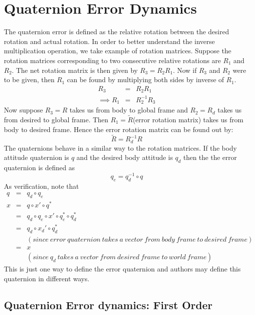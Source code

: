 \documentclass{article}
\begin{document}
	
	
	\section{Quaternion Error Dynamics}
	
	The quaternion error is defined as the relative rotation between the desired rotation and actual rotation. In order to better understand the inverse multiplication operation, we take example of rotation matrices. Suppose the rotation matrices corresponding to two consecutive relative rotations are $R_1$ and $R_2$. The net rotation matrix is then given by $R_3=R_2R_1$. Now if $R_3$ and $R_2$ were to be given, then $R_1$ can be found by multiplying both sides by inverse of $R_1$.
	\begin{eqnarray}
		R_3&=&R_2R_1\\
		\implies R_1 &=& R_2^{-1}R_3
	\end{eqnarray}
	Now suppose $R_3=R$ takes us from body to global frame and $R_2=R_d$ takes us from desired to global frame. Then $R_1=\tilde{R}$(error rotation matrix) takes us from body to desired frame. Hence the error rotation matrix can be found out by:
	\begin{equation}
		\tilde{R} = R_d^{-1}R
	\end{equation}
	The quaternions behave in a similar way to the rotation matrices. If the body attitude quaternion is $q$ and the desired body attitude is $q_d$ then the the error quaternion is defined as
	\begin{equation}
		q_e = q_d^{-1}\circ q
	\end{equation}
	As verification, note that
	\begin{eqnarray}
		q &=& q_d\circ q_e  \label{qedef} \\
		x &=& q \circ x' \circ q^*\\
		 &=& q_d \circ q_e \circ x' \circ q_e^*\circ q_d^*\\
		 &=& q_d \circ x_d' \circ q_d^*\\ ~&&(since ~ error ~quaternion~ takes~ a ~vector~ from~ body~ frame~ to~ desired ~frame)\\
		 &=& x \\~&& (since ~q_d~ takes~ a ~vector~ from ~desired~ frame ~to ~world ~frame)
	\end{eqnarray}
	This is just one way to define the error quaternion and authors may define this quaternion in different ways. 
	
	\subsection{Quaternion Error dynamics: First Order}
	
\end{document}
